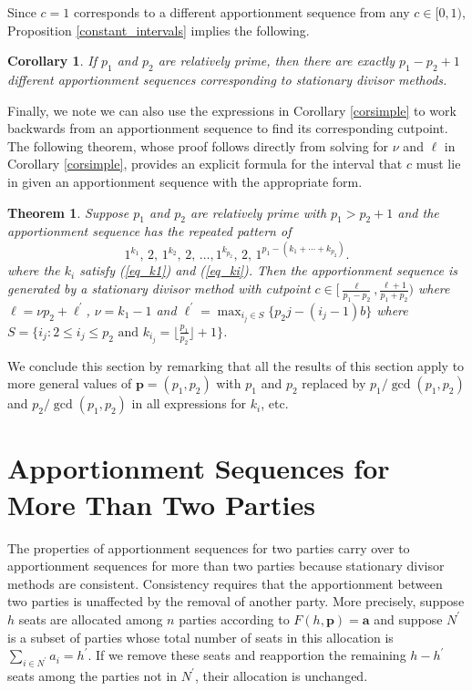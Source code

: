 \documentclass[pdflatex,sn-mathphys-num]{sn-jnl}
\theoremstyle{thmstyleone}%
\newtheorem{theorem}{Theorem}%
\newtheorem{corollary}{Corollary}
\theoremstyle{thmstyletwo}%
\theoremstyle{thmstylethree}%
\begin{document}
Since $c=1$ corresponds to a different apportionment sequence from any $c \in [0,1)$, Proposition \ref{constant_intervals} implies the following.

 \begin{corollary} \label{pair-count}
If $p_1$ and $p_2$  are relatively prime, then there are exactly $p_1-p_2+1$ different apportionment sequences corresponding to stationary divisor methods.
\end{corollary}


Finally, we note  we can also use the expressions in Corollary \ref{corsimple} to work backwards from an apportionment sequence to find its corresponding cutpoint. The following theorem, whose proof follows directly from solving for $\nu$ and $\ell$ in Corollary \ref{corsimple}, provides an explicit formula for the interval that $c$ must lie in given an apportionment sequence with the appropriate form. 



\begin{theorem}\label{prop:backwards}
Suppose $p_1$ and $p_2$  are relatively prime with $p_1>p_2+1$  and the apportionment sequence has the repeated pattern of 
$$1^{k_1}, \,   2, \, 1^{k_2}, \,  2, \,  \ldots, 1^{k_{p_2}}, \, 2, \, 1^{p_1-(k_1+\cdots +k_{p_2})}.$$ 
where the $k_i$ satisfy (\ref{eq_k1}) and (\ref{eq_ki}).
Then the apportionment sequence is generated by a stationary divisor method with cutpoint $c \in [\frac{\ell}{p_1-p_2}, \frac{\ell+1}{p_1+p_2})$ where  $\ell=\nu p_2+\ell^\prime$,  $\nu = k_1-1$ and $\ell^\prime = \max_{i_j \in S} \{ p_2j-(i_j-1)b \}$ where $S=\{i_j   : 2 \le i_j \le p_2 \text{ and }k_{i_j} = \lfloor \frac{p_1}{p_2} \rfloor+1 \}$. \end{theorem}


We conclude this section by remarking that all the results of this section apply to more general values of $\mathbf p=(p_1, p_2)$ with $p_1$ and $p_2$ replaced by $p_1/\gcd(p_1, p_2)$ and   $p_2/\gcd(p_1, p_2)$ in all expressions for $k_i$, etc. 


\section{Apportionment Sequences for More Than Two Parties}\label{more_parties}

The properties of apportionment sequences for two parties carry over to apportionment sequences for more than two parties because stationary divisor methods are consistent.
Consistency requires that the apportionment between two parties is unaffected by the removal of another party. More precisely, suppose $h$ seats are allocated among $n$ parties according to $F(h, \mathbf p) = \mathbf a$ and suppose $N^\prime$ is a subset of parties whose total number of seats in this allocation is $\sum_{i \in N^\prime} a_i = h^\prime$. If we remove these seats and reapportion the remaining $h-h^\prime$ seats among the parties not in $N^\prime$,  their allocation is unchanged.
\end{document}
